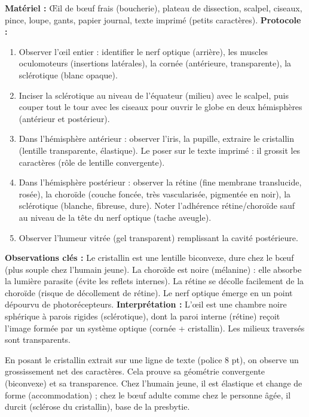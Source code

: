 \documentclass[11pt]{article}
\newcommand{\cle}[1]{{\popxbold\color{popdark}#1}}
\begin{document}
\begin{experience}
\textbf{Matériel :} Œil de bœuf frais (boucherie), plateau de dissection, scalpel, ciseaux, pince, loupe, gants, papier journal, texte imprimé (petits caractères).
\textbf{Protocole :}
\begin{enumerate}
\item Observer l'œil entier : identifier le nerf optique (arrière), les muscles oculomoteurs (insertions latérales), la cornée (antérieure, transparente), la sclérotique (blanc opaque).
\item Inciser la sclérotique au niveau de l'équateur (milieu) avec le scalpel, puis couper tout le tour avec les ciseaux pour ouvrir le globe en deux hémisphères (antérieur et postérieur).
\item Dans l'hémisphère antérieur : observer l'iris, la pupille, extraire le cristallin (lentille transparente, élastique). Le poser sur le texte imprimé : il grossit les caractères (rôle de lentille convergente).
\item Dans l'hémisphère postérieur : observer la rétine (fine membrane translucide, rosée), la choroïde (couche foncée, très vascularisée, pigmentée en noir), la sclérotique (blanche, fibreuse, dure). Noter l'adhérence rétine/choroïde sauf au niveau de la tête du nerf optique (tache aveugle).
\item Observer l'humeur vitrée (gel transparent) remplissant la cavité postérieure.
\end{enumerate}
\textbf{Observations clés :} Le cristallin est une lentille biconvexe, dure chez le bœuf (plus souple chez l'humain jeune). La choroïde est noire (mélanine) : elle absorbe la lumière parasite (évite les reflets internes). La rétine se décolle facilement de la choroïde (risque de décollement de rétine). Le nerf optique émerge en un point dépourvu de photorécepteurs.
\textbf{Interprétation :} L'œil est une chambre noire sphérique à parois rigides (sclérotique), dont la paroi interne (rétine) reçoit l'image formée par un système optique (cornée + cristallin). Les milieux traversés sont transparents.
\end{experience}

\begin{exemplebox}
En posant le cristallin extrait sur une ligne de texte (police 8 pt), on observe un grossissement net des caractères. Cela prouve sa géométrie \cle{convergente} (biconvexe) et sa transparence. Chez l'humain jeune, il est élastique et change de forme (accommodation) ; chez le bœuf adulte comme chez le personne âgée, il durcit (sclérose du cristallin), base de la \cle{presbytie}.
\end{exemplebox}
\end{document}
